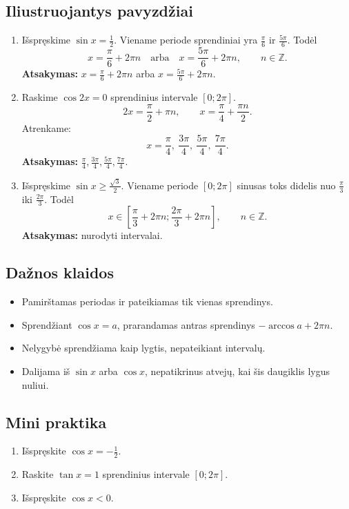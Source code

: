 \subsection{Iliustruojantys pavyzdžiai}
\begin{enumerate}[label=\arabic*.]
\item Išspręskime \(\sin x=\frac12\).
Viename periode sprendiniai yra \(\frac{\pi}{6}\) ir \(\frac{5\pi}{6}\). Todėl
\[
x=\frac{\pi}{6}+2\pi n\quad\text{arba}\quad x=\frac{5\pi}{6}+2\pi n,\qquad n\in\mathbb{Z}.
\]
\textbf{Atsakymas:} \(x=\frac{\pi}{6}+2\pi n\) arba \(x=\frac{5\pi}{6}+2\pi n\).

\item Raskime \(\cos 2x=0\) sprendinius intervale \([0;2\pi]\).
\[
2x=\frac{\pi}{2}+\pi n,\qquad x=\frac{\pi}{4}+\frac{\pi n}{2}.
\]
Atrenkame:
\[
x=\frac{\pi}{4},\ \frac{3\pi}{4},\ \frac{5\pi}{4},\ \frac{7\pi}{4}.
\]
\textbf{Atsakymas:} \(\frac{\pi}{4},\frac{3\pi}{4},\frac{5\pi}{4},\frac{7\pi}{4}\).

\item Išspręskime \(\sin x\ge\frac{\sqrt3}{2}\).
Viename periode \([0;2\pi]\) sinusas toks didelis nuo \(\frac{\pi}{3}\) iki \(\frac{2\pi}{3}\). Todėl
\[
x\in\left[\frac{\pi}{3}+2\pi n;\frac{2\pi}{3}+2\pi n\right],\qquad n\in\mathbb{Z}.
\]
\textbf{Atsakymas:} nurodyti intervalai.
\end{enumerate}

\subsection{Dažnos klaidos}
\begin{itemize}
\item Pamirštamas periodas ir pateikiamas tik vienas sprendinys.
\item Sprendžiant \(\cos x=a\), prarandamas antras sprendinys \(-\arccos a+2\pi n\).
\item Nelygybė sprendžiama kaip lygtis, nepateikiant intervalų.
\item Dalijama iš \(\sin x\) arba \(\cos x\), nepatikrinus atvejų, kai šis daugiklis lygus nuliui.
\end{itemize}

\subsection{Mini praktika}
\begin{enumerate}[label=\alph*)]
\item Išspręskite \(\cos x=-\frac12\).
\item Raskite \(\tan x=1\) sprendinius intervale \([0;2\pi]\).
\item Išspręskite \(\cos x<0\).
\end{enumerate}

